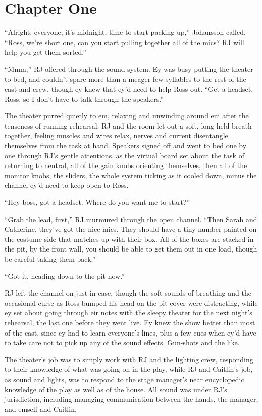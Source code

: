 \chapter*{Chapter One}

``Alright, everyone, it's midnight, time to start packing up,'' Johansson called.  ``Ross, we're short one, can you start pulling together all of the mics?  RJ will help you get them sorted.''

``Mmm,'' RJ offered through the sound system.  Ey was busy putting the theater to bed, and couldn't spare more than a meager few syllables to the rest of the cast and crew, though ey knew that ey'd need to help Ross out.  ``Get a headset, Ross, so I don't have to talk through the speakers.''

The theater purred quietly to em, relaxing and unwinding around em after the tenseness of running rehearsal.  RJ and the room let out a soft, long-held breath together, feeling muscles and wires relax, nerves and current disentangle themselves from the task at hand.  Speakers signed off and went to bed one by one through RJ's gentle attentions, as the virtual board set about the task of returning to neutral, all of the gain knobs orienting themselves, then all of the monitor knobs, the sliders, the whole system ticking as it cooled down, minus the channel ey'd need to keep open to Ross.

``Hey boss, got a headset.  Where do you want me to start?''

``Grab the lead, first,'' RJ murmured through the open channel.  ``Then Sarah and Catherine, they've got the nice mics.  They should have a tiny number painted on the costume side that matches up with their box.  All of the boxes are stacked in the pit, by the front wall, you should be able to get them out in one load, though be careful taking them back.''

``Got it, heading down to the pit now.''

RJ left the channel on just in case, though the soft sounds of breathing and the occasional curse as Ross bumped his head on the pit cover were distracting, while ey set about going through eir notes with the sleepy theater for the next night's rehearsal, the last one before they went live.  Ey knew the show better than most of the cast, since ey had to learn everyone's lines, plus a few cues when ey'd have to take care not to pick up any of the sound effects.  Gun-shots and the like.

The theater's job was to simply work with RJ and the lighting crew, responding to their knowledge of what was going on in the play, while RJ and Caitlin's job, as sound and lights, was to respond to the stage manager's near encyclopedic knowledge of the play as well as of the house.  All sound was under RJ's jurisdiction, including managing communication between the hands, the manager, and emself and Caitlin.

